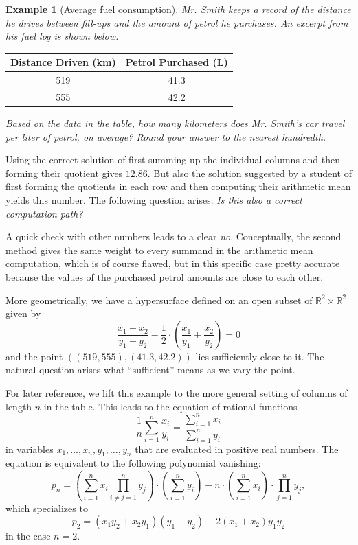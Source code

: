 \documentclass[11pt]{amsart}
\numberwithin{equation}{section}
\theoremstyle{plain}
\theoremstyle{definition}
\newtheorem{example}[theorem]{Example}
\newcommand{\R}{\mathbb{R}}
\begin{document}
\begin{example}[Average fuel consumption]\label{example:fuel-consumption}
\emph{Mr. Smith keeps a record of the distance he drives between fill-ups and the amount of petrol he purchases. An excerpt from his fuel log is shown below.}
\begin{table}[H]
\centering
\begin{tabular}{c|c}
\textbf{Distance Driven (km)} & \textbf{Petrol Purchased (L)} \\
\hline
519 & 41.3 \\
555 & 42.2
\end{tabular}
\end{table}
\emph{Based on the data in the table, how many kilometers does Mr. Smith’s car travel per liter of petrol, on average? Round your answer to the nearest hundredth.}

Using the correct solution of first summing up the individual columns and then forming their quotient gives $12.86$. But also the solution suggested by a student of first forming the quotients in each row and then computing their arithmetic mean yields this number. The following question arises: \emph{Is this also a correct computation path?}

A quick check with other numbers leads to a clear \emph{no}. Conceptually, the second method gives the same weight to every summand in the arithmetic mean computation, which is of course flawed, but in this specific case pretty accurate because the values of the purchased petrol amounts are close to each other. 

More geometrically, we have a hypersurface defined on an open subset of $\R^2 \times \R^2$ given by
\[
\frac{x_1 + x_2}{y_1 + y_2} - \frac{1}{2} \cdot \left( \frac{x_1}{y_1} + \frac{x_2}{y_2} \right) = 0
\]
and the point $((519, 555),(41.3,42.2))$ lies sufficiently close to it. The natural question arises what ``sufficient'' means as we vary the point.

For later reference, we lift this example to the more general setting of columns of length $n$ in the table. This leads to the equation of rational functions 
\[
\frac{1}{n} \sum_{i = 1}^n \frac{x_i}{y_i} = \frac{\sum_{i = 1}^n x_i}{\sum_{i = 1}^n y_i}
\]
in variables $x_1,\ldots,x_n,y_1,\ldots,y_n$ that are evaluated in positive real numbers. The equation is equivalent to the following polynomial vanishing:
\[
p_n = \left( \sum_{i = 1}^n x_i \prod_{ i \neq j = 1 }^n y_j \right) \cdot \left( \sum_{i = 1}^n y_i \right)- n\cdot \left( \sum_{i = 1}^n x_i \right) \cdot \prod_{ j = 1 }^n y_j,
\]
which specializes to 
\[
p_2 = (x_1y_2 + x_2y_1)(y_1 + y_2) - 2(x_1+x_2)y_1y_2
\]
in the case $n = 2$.
\end{example}
\end{document}
